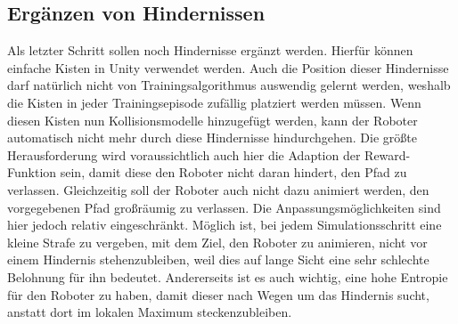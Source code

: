 \subsection{Ergänzen von Hindernissen}
Als letzter Schritt sollen noch Hindernisse ergänzt werden.
Hierfür können einfache Kisten in Unity verwendet werden.
Auch die Position dieser Hindernisse darf natürlich nicht von Trainingsalgorithmus auswendig gelernt werden, weshalb die Kisten in jeder Trainingsepisode zufällig platziert werden müssen.
Wenn diesen Kisten nun Kollisionsmodelle hinzugefügt werden, kann der Roboter automatisch nicht mehr durch diese Hindernisse hindurchgehen.
Die größte Herausforderung wird voraussichtlich auch hier die Adaption der Reward-Funktion sein, damit diese den Roboter nicht daran hindert, den Pfad zu verlassen.
Gleichzeitig soll der Roboter auch nicht dazu animiert werden, den vorgegebenen Pfad großräumig zu verlassen.
Die Anpassungsmöglichkeiten sind hier jedoch relativ eingeschränkt.
Möglich ist, bei jedem Simulationsschritt eine kleine Strafe zu vergeben, mit dem Ziel, den Roboter zu animieren, nicht vor einem Hindernis stehenzubleiben, weil dies auf lange Sicht eine sehr schlechte Belohnung für ihn bedeutet.
Andererseits ist es auch wichtig, eine hohe Entropie für den Roboter zu haben, damit dieser nach Wegen um das Hindernis sucht, anstatt dort im lokalen Maximum steckenzubleiben.

    
